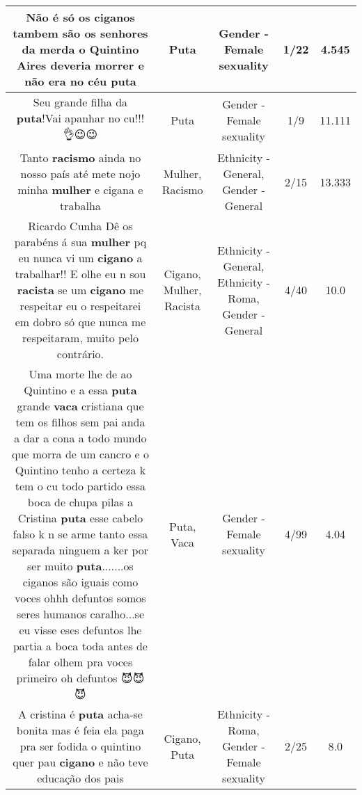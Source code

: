 \documentclass[11pt]{article}
\newlength\mylength
\begin{document}
\begin{center}
\begin{longtable}{|C{.65\mylength}|C{.30\mylength}|C{.12\mylength}|C{.12\mylength}|C{.12\mylength}|}
  \small Não é só os ciganos tambem são os senhores da merda o Quintino Aires deveria morrer e não era no céu puta\normalsize   & Puta & Gender - Female sexuality & 1/22 & 4.545 \\  \hline
  \small Seu grande filha da \textbf{puta}!Vai apanhar no cu!!!👌😉😉\normalsize   & Puta & Gender - Female sexuality & 1/9 & 11.111 \\  \hline
  \small Tanto \textbf{racismo} ainda no nosso país  até mete nojo  minha \textbf{mulher} e cigana e trabalha\normalsize   & Mulher, Racismo & Ethnicity - General, Gender - General & 2/15 & 13.333 \\  \hline
  \small Ricardo Cunha Dê os parabéns á sua \textbf{mulher} pq eu nunca vi um \textbf{cigano} a trabalhar!! E olhe eu n sou \textbf{racista} se um \textbf{cigano} me respeitar eu o respeitarei em dobro só que nunca me respeitaram, muito pelo contrário.\normalsize   & Cigano, Mulher, Racista & Ethnicity - General, Ethnicity - Roma, Gender - General & 4/40 & 10.0 \\  \hline
  \small Uma morte lhe de ao Quintino e a essa \textbf{puta} grande \textbf{vaca} cristiana que tem os filhos sem pai anda a dar a cona a todo mundo que morra de um cancro e o Quintino tenho a certeza k tem o cu  todo partido essa boca de chupa pilas a Cristina \textbf{puta} esse cabelo falso k n se arme tanto essa separada ninguem a ker por ser muito \textbf{puta}.......os ciganos são iguais como voces ohhh defuntos somos seres humanos caralho...se eu visse eses defuntos lhe partia a boca toda antes de falar olhem pra voces primeiro oh defuntos 😈😈😈\normalsize   & Puta, Vaca & Gender - Female sexuality & 4/99 & 4.04 \\  \hline
  \small A cristina é \textbf{puta} acha-se bonita mas é feia ela paga pra ser fodida o quintino quer pau \textbf{cigano} e não teve educação dos pais\normalsize   & Cigano, Puta & Ethnicity - Roma, Gender - Female sexuality & 2/25 & 8.0 \\  \hline

\end{longtable}
\end{center}
\end{document}
